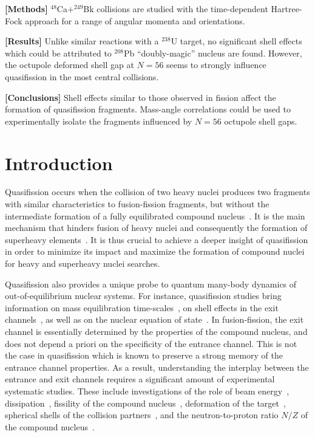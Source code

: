 		{\bf [Methods]} $^{48}$Ca$+^{249}$Bk collisions are studied with the time-dependent Hartree-Fock approach for a range of angular momenta and orientations.
		
		{\bf [Results]} Unlike similar reactions with a $^{238}$U target, no significant shell effects which could be attributed to $^{208}$Pb ``doubly-magic'' nucleus are found. However, the octupole deformed shell gap at $N=56$ seems to strongly influence quasifission in the most central collisions.
		
		{\bf [Conclusions]} Shell effects similar to those observed in fission affect the formation of quasifission fragments. Mass-angle correlations could be used to experimentally isolate the fragments influenced by $N=56$ octupole shell gaps.



\section{Introduction}

Quasifission occurs when the collision of two heavy nuclei produces two fragments with similar characteristics to fusion-fission fragments, but without the intermediate formation of a fully equilibrated compound nucleus~\citep{heusch1978,back1981,back1983,bock1982}.
It is the main mechanism that hinders fusion of heavy nuclei and consequently the formation of
superheavy elements~\citep{sahm1984,gaggeler1984,schmidt1991,back2014,khuyagbaatar2018,banerjee2019}.
It is thus crucial to achieve a deeper insight of quasifission in order to minimize its impact and maximize the formation of compound nuclei for heavy and superheavy nuclei searches.

Quasifission also provides a unique probe to quantum many-body dynamics of out-of-equilibrium nuclear systems.
For instance, quasifission studies bring information on mass equilibration time-scales~\citep{toke1985,shen1987,durietz2011}, on shell effects in the exit channels~\citep{itkis2004,nishio2008,kozulin2014,wakhle2014,morjean2017}, as well as on the nuclear equation of state~\citep{veselsky2016,zheng2018}.
In fusion-fission, the exit channel is essentially determined by the properties of the compound nucleus, and does not depend a priori on the specificity of the entrance channel.
This is not the case in quasifission which is known to preserve a strong memory of the entrance channel properties.
As a result, understanding the interplay between the entrance and exit channels requires a significant amount of experimental systematic studies.
These include investigations of the role of beam energy~\citep{back1996,nishio2008,nishio2012}, dissipation~\citep{williams2018}, fissility of the compound nucleus~\citep{lin2012,durietz2013},
deformation of the target~\citep{hinde1995,hinde1996,knyazheva2007,hinde2008,nishio2008},
spherical shells of the collision partners~\citep{simenel2012b,mohanto2018}, and the neutron-to-proton ratio
$N/Z$ of the compound nucleus~\citep{hammerton2015,hammerton2019}.

